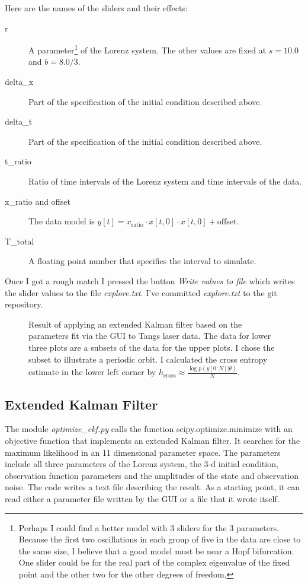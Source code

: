 \documentclass[12pt]{article}
\newcommand{\filterplot}[2]{
\begin{figure}
  \centering
  \resizebox{1.0\textwidth}{!}{\texttt{[image: \#1\_plot.pdf]}}
  \caption{#2}
  \label{fig:#1}
\end{figure}
}
\begin{document}
Here are the names of the sliders and their effects:
\begin{description}
\item[r] A parameter\footnote{Perhaps I could find a better model with
    3 sliders for the 3 parameters.  Because the first two
    oscillations in each group of five in the data are close to the
    same size, I believe that a good model must be near a Hopf
    bifurcation.  One slider could be for the real part of the complex
    eigenvalue of the fixed point and the other two for the other
    degrees of freedom.} of the Lorenz system.  The other values are
  fixed at $s=10.0$ and $b=8.0/3$.
\item[delta\_x] Part of the specification of the initial condition
  described above.
\item[delta\_t] Part of the specification of the initial condition
  described above.
\item[t\_ratio] Ratio of time intervals of the Lorenz system and time
  intervals of the data.
\item[x\_ratio and offset] The data model is $y[t] = x_{\text{ratio}} \cdot
  x[t,0] \cdot x[t,0] + \text{offset}$.
\item[T\_total] A floating point number that specifies the interval to
  simulate.
\end{description}
Once I got a rough match I pressed the button \emph{Write values to
  file} which writes the slider values to the file \emph{explore.txt}.
I've committed \emph{explore.txt} to the git repository.

\filterplot{gui}{Result of applying an extended Kalman filter based on the
    parameters fit via the GUI to Tangs laser data.  The data for
    lower three plots are a subsets of the data for the upper plots.
    I chose the subset to illustrate a periodic orbit.  I calculated
    the cross entropy estimate in the lower left corner by
    $h_{\text{cross}} \approx \frac{\log{p(y[0:N]|\theta)}}{N}$.}

\subsection{Extended Kalman Filter}
\label{sec:ekf}

The module \emph{optimize\_ekf.py} calls the function
scipy.optimize.minimize with an objective function that implements an
extended Kalman filter.  It searches for the maximum likelihood in an
11 dimensional parameter space.  The parameters include all three
parameters of the Lorenz system, the 3-d initial condition,
observation function parameters and the amplitudes of the state and
observation noise.  The code writes a text file describing the result.
As a starting point, it can read either a parameter file written by
the GUI or a file that it wrote itself.
\end{document}
